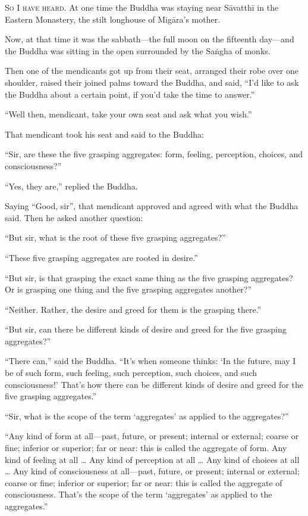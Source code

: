 \documentclass[12pt,openany]{book}%
\newcommand*{\scevam}[1]{\textsc{#1}}
\begin{document}
\scevam{So I have heard. }At one time the Buddha was staying near \textsanskrit{Sāvatthī} in the Eastern Monastery, the stilt longhouse of \textsanskrit{Migāra}’s mother. 

Now, at that time it was the sabbath—the full moon on the fifteenth day—and the Buddha was sitting in the open surrounded by the \textsanskrit{Saṅgha} of monks. 

Then one of the mendicants got up from their seat, arranged their robe over one shoulder, raised their joined palms toward the Buddha, and said, “I’d like to ask the Buddha about a certain point, if you’d take the time to answer.” 

“Well then, mendicant, take your own seat and ask what you wish.” 

That mendicant took his seat and said to the Buddha: 

“Sir, are these the five grasping aggregates: form, feeling, perception, choices, and consciousness?” 

“Yes, they are,” replied the Buddha. 

Saying “Good, sir”, that mendicant approved and agreed with what the Buddha said. Then he asked another question: 

“But sir, what is the root of these five grasping aggregates?” 

“These five grasping aggregates are rooted in desire.” 

“But sir, is that grasping the exact same thing as the five grasping aggregates? Or is grasping one thing and the five grasping aggregates another?” 

“Neither. Rather, the desire and greed for them is the grasping there.” 

“But sir, can there be different kinds of desire and greed for the five grasping aggregates?” 

“There can,” said the Buddha. “It’s when someone thinks: ‘In the future, may I be of such form, such feeling, such perception, such choices, and such consciousness!’ That’s how there can be different kinds of desire and greed for the five grasping aggregates.” 

“Sir, what is the scope of the term ‘aggregates’ as applied to the aggregates?” 

“Any kind of form at all—past, future, or present; internal or external; coarse or fine; inferior or superior; far or near: this is called the aggregate of form. Any kind of feeling at all … Any kind of perception at all … Any kind of choices at all … Any kind of consciousness at all—past, future, or present; internal or external; coarse or fine; inferior or superior; far or near: this is called the aggregate of consciousness. That’s the scope of the term ‘aggregates’ as applied to the aggregates.” 
\end{document}

